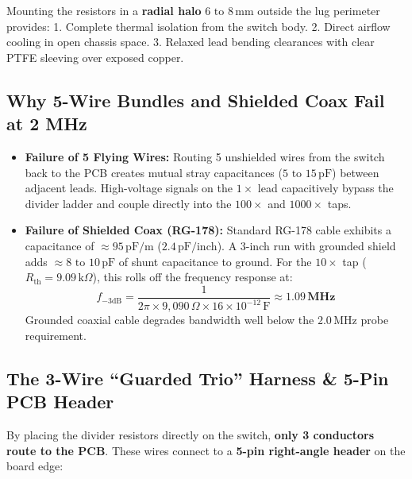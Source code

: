 \documentclass[11pt, letterpaper]{article}
\begin{document}
Mounting the resistors in a \textbf{radial halo} $6\text{ to }8\,\text{mm}$ outside the lug perimeter provides:
1. Complete thermal isolation from the switch body.
2. Direct airflow cooling in open chassis space.
3. Relaxed lead bending clearances with clear PTFE sleeving over exposed copper.

\subsection{Why 5-Wire Bundles and Shielded Coax Fail at 2 MHz}
\begin{itemize}[leftmargin=1.5em]
    \item \textbf{Failure of 5 Flying Wires:} Routing 5 unshielded wires from the switch back to the PCB creates mutual stray capacitances ($5\text{ to }15\,\text{pF}$) between adjacent leads. High-voltage signals on the $1\times$ lead capacitively bypass the divider ladder and couple directly into the $100\times$ and $1000\times$ taps.
    \item \textbf{Failure of Shielded Coax (RG-178):} Standard RG-178 cable exhibits a capacitance of $\approx 95\,\text{pF/m}$ ($2.4\,\text{pF/inch}$). A 3-inch run with grounded shield adds $\approx 8\text{ to }10\,\text{pF}$ of shunt capacitance to ground. For the $10\times$ tap ($R_{\text{th}} = 9.09\,\text{k}\Omega$), this rolls off the frequency response at:
    \begin{equation}
        f_{-3\text{dB}} = \frac{1}{2 \pi \times 9{,}090\,\Omega \times 16 \times 10^{-12}\,\text{F}} \approx \mathbf{1.09\,\text{MHz}}
    \end{equation}
    Grounded coaxial cable degrades bandwidth well below the $2.0\,\text{MHz}$ probe requirement.
\end{itemize}

\subsection{The 3-Wire ``Guarded Trio'' Harness \& 5-Pin PCB Header}
By placing the divider resistors directly on the switch, \textbf{only 3 conductors route to the PCB}. These wires connect to a \textbf{5-pin right-angle header} on the board edge:
\end{document}
